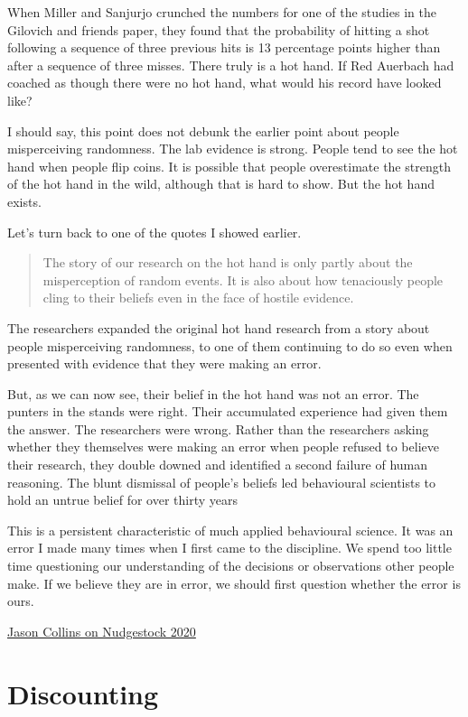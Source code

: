 \documentclass[
]{book}
\begin{document}
When Miller and Sanjurjo crunched the numbers for one of the studies in the Gilovich and friends paper, they found that the probability of hitting a shot following a sequence of three previous hits is 13 percentage points higher than after a sequence of three misses. There truly is a hot hand. If Red Auerbach had coached as though there were no hot hand, what would his record have looked like?

I should say, this point does not debunk the earlier point about people misperceiving randomness. The lab evidence is strong. People tend to see the hot hand when people flip coins. It is possible that people overestimate the strength of the hot hand in the wild, although that is hard to show. But the hot hand exists.

Let's turn back to one of the quotes I showed earlier.

\begin{quote}
The story of our research on the hot hand is only partly about the misperception of random events. It is also about how tenaciously people cling to their beliefs even in the face of hostile evidence.
\end{quote}

The researchers expanded the original hot hand research from a story about people misperceiving randomness, to one of them continuing to do so even when presented with evidence that they were making an error.

But, as we can now see, their belief in the hot hand was not an error. The punters in the stands were right. Their accumulated experience had given them the answer. The researchers were wrong. Rather than the researchers asking whether they themselves were making an error when people refused to believe their research, they double downed and identified a second failure of human reasoning. The blunt dismissal of people's beliefs led behavioural scientists to hold an untrue belief for over thirty years

This is a persistent characteristic of much applied behavioural science. It was an error I made many times when I first came to the discipline. We spend too little time questioning our understanding of the decisions or observations other people make. If we believe they are in error, we should first question whether the error is ours.

\href{https://jasoncollins.blog/2020/06/12/arent-we-smart-fellow-behavioural-scientists/}{Jason Collins on Nudgestock 2020}

\hypertarget{discounting}{%
\chapter{Discounting}\label{discounting}}
\end{document}

